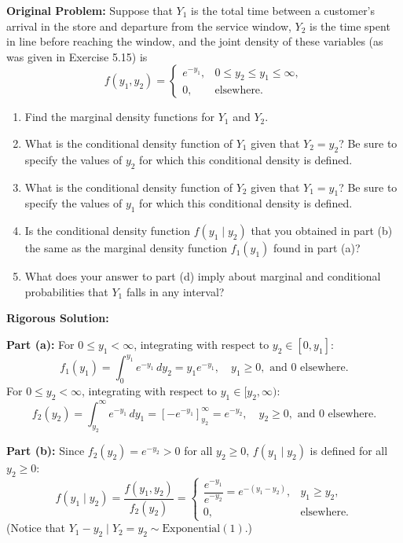 \documentclass[11pt, letterpaper]{article}
\theoremstyle{definition}
\theoremstyle{remark}
\begin{document}
\textbf{Original Problem:}
Suppose that $Y_1$ is the total time between a customer's arrival in the store and departure from the service window, $Y_2$ is the time spent in line before reaching the window, and the joint density of these variables (as was given in Exercise 5.15) is
\[ f(y_1, y_2) = \begin{cases} e^{-y_1}, & 0 \le y_2 \le y_1 \le \infty, \\ 0, & \text{elsewhere.} \end{cases} \]
\begin{enumerate}[label=\textbf{\alph*}]
    \item Find the marginal density functions for $Y_1$ and $Y_2$.
    \item What is the conditional density function of $Y_1$ given that $Y_2 = y_2$? Be sure to specify the values of $y_2$ for which this conditional density is defined.
    \item What is the conditional density function of $Y_2$ given that $Y_1 = y_1$? Be sure to specify the values of $y_1$ for which this conditional density is defined.
    \item Is the conditional density function $f(y_1 \mid y_2)$ that you obtained in part (b) the same as the marginal density function $f_1(y_1)$ found in part (a)?
    \item What does your answer to part (d) imply about marginal and conditional probabilities that $Y_1$ falls in any interval?
\end{enumerate}

\textbf{Rigorous Solution:}

\textbf{Part (a):} For $0 \le y_1 < \infty$, integrating with respect to $y_2 \in [0, y_1]$:
\[ f_1(y_1) = \int_0^{y_1} e^{-y_1} \, dy_2 = y_1 e^{-y_1}, \quad y_1 \ge 0, \text{ and } 0 \text{ elsewhere.} \]
For $0 \le y_2 < \infty$, integrating with respect to $y_1 \in [y_2, \infty)$:
\[ f_2(y_2) = \int_{y_2}^\infty e^{-y_1} \, dy_1 = \left[ -e^{-y_1} \right]_{y_2}^\infty = e^{-y_2}, \quad y_2 \ge 0, \text{ and } 0 \text{ elsewhere.} \]

\textbf{Part (b):} Since $f_2(y_2) = e^{-y_2} > 0$ for all $y_2 \ge 0$, $f(y_1 \mid y_2)$ is defined for all $y_2 \ge 0$:
\[ f(y_1 \mid y_2) = \frac{f(y_1, y_2)}{f_2(y_2)} = \begin{cases} \dfrac{e^{-y_1}}{e^{-y_2}} = e^{-(y_1 - y_2)}, & y_1 \ge y_2, \\ 0, & \text{elsewhere.} \end{cases} \]
(Notice that $Y_1 - y_2 \mid Y_2 = y_2 \sim \text{Exponential}(1)$.)
\end{document}
